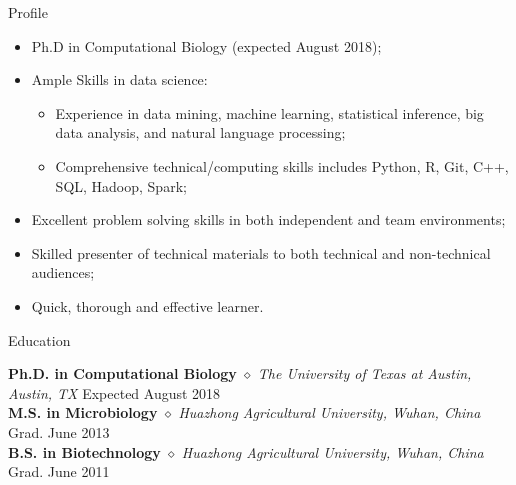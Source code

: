 \documentclass{my_resume} %
\begin{document}

\begin{rSection}{Profile}
\renewcommand\labelitemi{$\cdot$}
\begin{itemize}
  \item Ph.D in Computational Biology (expected August 2018);
  \vspace{-1.7em}\\
  \item Ample Skills in data science:
  \vspace{-1.7em}\\
    \begin{itemize}
      \item Experience in data mining, machine learning, statistical inference,
        big data analysis, and natural language processing;
      \vspace{-1.7em}\\
      \item Comprehensive technical/computing skills includes Python, R, Git,
        C++, SQL, Hadoop, Spark;
      \vspace{-1.7em}\\
    \end{itemize}
  \item Excellent problem solving skills in both independent and team
    environments;
  \vspace{-1.7em}\\
  \item Skilled presenter of technical materials to both technical and
    non-technical audiences;
  \vspace{-1.7em}\\
  \item Quick, thorough and effective learner.
\end{itemize}
\end{rSection}


\begin{rSection}{Education}

{\bf Ph.D. in Computational Biology} {$\diamond$} {\em The University of
Texas at Austin, Austin, TX} \hfill {Expected August 2018} \\
{\bf M.S. in Microbiology} {$\diamond$} {\em Huazhong Agricultural University,
Wuhan, China} \hfill {Grad. June 2013} \\
{\bf B.S. in Biotechnology} {$\diamond$} {\em Huazhong Agricultural University,
Wuhan, China} \hfill {Grad. June 2011}
\end{rSection}
\end{document}
